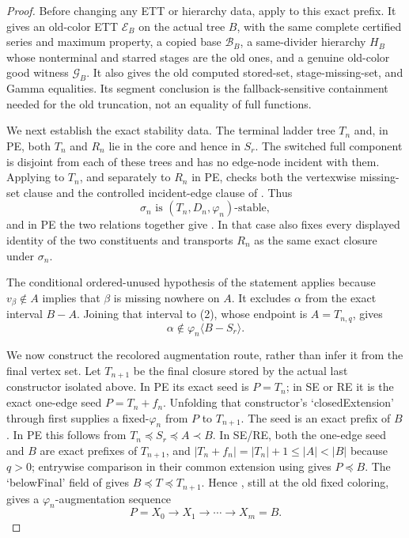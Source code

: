 \begin{proof}
Before changing any ETT or hierarchy data, apply
 to this exact prefix.
It gives an old-color ETT $\mathcal E_B$ on the actual tree $B$, with
the same complete certified series and maximum property, a copied base
$\mathcal B_B$, a same-divider hierarchy $H_B$ whose nonterminal and
starred stages are the old ones, and a genuine old-color good witness
$\mathcal G_B$.  It also gives the old computed stored-set,
stage-missing-set, and Gamma equalities.  Its segment conclusion is the
fallback-sensitive containment needed for the old truncation, not an
equality of full  functions.

We next establish the exact stability data.  The terminal ladder tree
$T_n$ and, in PE, both $T_n$ and $R_n$ lie in the core and hence in
$S_r$.  The switched full component is disjoint from each of these
trees and has no edge-node incident with them.  Applying
 to $T_n$, and separately to
$R_n$ in PE, checks both the vertexwise missing-set clause and the
controlled incident-edge clause of .  Thus
\[
 \sigma_n\text{ is }(T_n,D_n,\varphi_n)\text{-stable},          \tag{6}
\]
and in PE the two relations together give
.  In that case
 also fixes every displayed
identity of the two constituents and transports $R_n$ as the same exact
closure under $\sigma_n$.

The conditional ordered-unused hypothesis of the statement applies
because $v_\beta\notin A$ implies that $\beta$ is missing nowhere on
$A$.  It excludes $\alpha$ from the exact interval $B-A$.  Joining that
interval to (2), whose endpoint is $A=T_{n,q}$, gives
\[
 \alpha\notin\varphi_n\langle B-S_r\rangle.                    \tag{7}
\]

We now construct the recolored augmentation route, rather than infer it
from the final vertex set.  Let $T_{n+1}$ be the final closure stored by
the actual last constructor isolated above.  In PE its exact seed is
$P=T_n$; in SE or RE it is the exact one-edge seed $P=T_n+f_n$.
Unfolding that constructor's `closedExtension' through
 first supplies a fixed-$\varphi_n$
 from $P$ to $T_{n+1}$.
The seed is an exact prefix of $B$.  In PE this follows from
$T_n\preccurlyeq S_r\preccurlyeq A\prec B$.  In SE/RE, both the
one-edge seed and $B$ are exact prefixes of $T_{n+1}$, and
$|T_n+f_n|=|T_n|+1\leq|A|<|B|$ because $q>0$; entrywise comparison in
their common extension using  gives
$P\preccurlyeq B$.  The `belowFinal' field of
 gives
$B\preccurlyeq T\preccurlyeq T_{n+1}$.  Hence
, still at the old fixed
coloring, gives a $\varphi_n$-augmentation sequence
\[
        P=X_0\longrightarrow X_1\longrightarrow\cdots
          \longrightarrow X_m=B.                              \tag{8}
\]


\end{proof}
